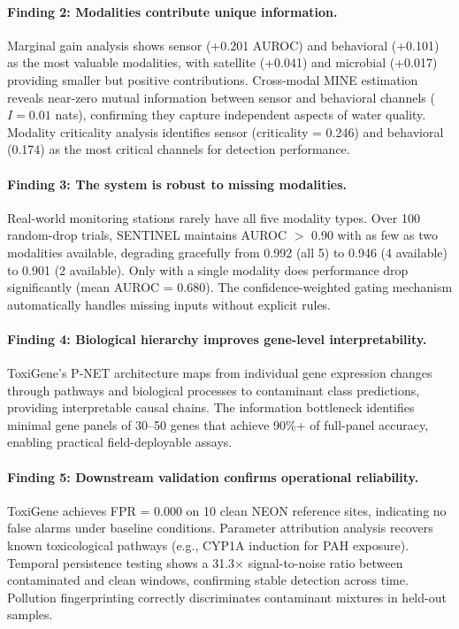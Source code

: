\paragraph{Finding 2: Modalities contribute unique information.}
Marginal gain analysis shows sensor (+0.201 AUROC) and behavioral
(+0.101) as the most valuable modalities, with satellite (+0.041)
and microbial (+0.017) providing smaller but positive contributions.
Cross-modal MINE estimation reveals near-zero mutual information between
sensor and behavioral channels ($I = 0.01$ nats), confirming they capture
independent aspects of water quality. Modality criticality analysis
identifies sensor (criticality = 0.246) and behavioral (0.174) as the
most critical channels for detection performance.

\paragraph{Finding 3: The system is robust to missing modalities.}
Real-world monitoring stations rarely have all five modality types.
Over 100 random-drop trials, SENTINEL maintains AUROC $>$ 0.90 with
as few as two modalities available, degrading gracefully from 0.992
(all 5) to 0.946 (4 available) to 0.901 (2 available). Only with a
single modality does performance drop significantly (mean AUROC = 0.680).
The confidence-weighted gating mechanism automatically handles missing
inputs without explicit rules.

\paragraph{Finding 4: Biological hierarchy improves gene-level interpretability.}
ToxiGene's P-NET architecture maps from individual gene expression changes
through pathways and biological processes to contaminant class predictions,
providing interpretable causal chains. The information bottleneck identifies
minimal gene panels of 30--50 genes that achieve 90\%+ of full-panel
accuracy, enabling practical field-deployable assays.

\paragraph{Finding 5: Downstream validation confirms operational reliability.}
ToxiGene achieves FPR = 0.000 on 10 clean NEON reference sites, indicating
no false alarms under baseline conditions. Parameter attribution analysis
recovers known toxicological pathways (e.g., CYP1A induction for PAH
exposure). Temporal persistence testing shows a 31.3$\times$ signal-to-noise
ratio between contaminated and clean windows, confirming stable detection
across time. Pollution fingerprinting correctly discriminates contaminant
mixtures in held-out samples.
